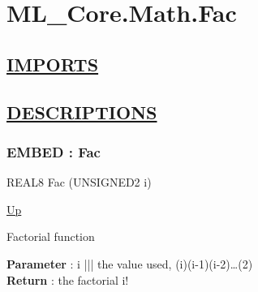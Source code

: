 \chapter*{ML\_Core.Math.Fac}
\hypertarget{ecldoc:toc:ML_Core.Math.Fac}{}

\section*{\underline{IMPORTS}}

\section*{\underline{DESCRIPTIONS}}
\subsection*{EMBED : Fac}
\hypertarget{ecldoc:ml_core.math.fac}{}
\begin{minipage}[t]{\textwidth}
\begin{flushleft}
REAL8 Fac (UNSIGNED2 i)
\end{flushleft}
\end{minipage}
\hyperlink{ecldoc:toc:ML_Core/Math}{Up}

\par
Factorial function
\par
\textbf{Parameter} : i ||| the value used, (i)(i-1)(i-2)\ldots(2) \\
\textbf{Return} : the factorial i! \\
